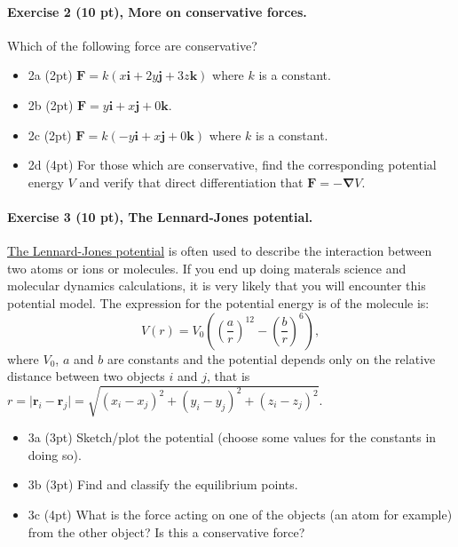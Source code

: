 \documentclass[%
oneside,                 %
final,                   %
10pt]{article}
\begin{document}
\noindent
\paragraph{Exercise 2 (10 pt), More on conservative forces.}
Which of the following force are conservative?
\begin{itemize}
\item 2a (2pt) $\bm{F}=k(x\bm{i}+2y\bm{j}+3z\bm{k})$ where $k$ is a constant.

\item 2b (2pt) $\bm{F}=y\bm{i}+x\bm{j}+0\bm{k}$.

\item 2c (2pt) $\bm{F}=k(-y\bm{i}+x\bm{j}+0\bm{k})$ where $k$ is a constant.

\item 2d (4pt) For those which are conservative, find the corresponding potential energy $V$ and verify that direct differentiation that $\bm{F}=-\bm{\nabla} V$.
\end{itemize}

\noindent
\paragraph{Exercise 3 (10 pt), The Lennard-Jones potential.}
\href{{https://en.wikipedia.org/wiki/Lennard-Jones_potential}}{The Lennard-Jones potential} is often used to describe
the interaction between two atoms or ions or molecules. If you end up doing materals science and molecular dynamics calculations, it is very likely that you will encounter this potential model.
The expression for the potential energy is
of the molecule is:
\[
V(r) = V_0\left((\frac{a}{r})^{12}-(\frac{b}{r})^{6}\right),
\]
where $V_0$, $a$ and $b$ are constants and the potential depends only on the relative distance between two objects
$i$ and $j$, that is $r=\vert\bm{r}_i-\bm{r}_j\vert=\sqrt{(x_i-x_j)^2+(y_i-y_j)^2+(z_i-z_j)^2}$.

\begin{itemize}
\item 3a (3pt) Sketch/plot the potential (choose some values for the constants in doing so).

\item 3b (3pt) Find and classify the equilibrium points.

\item 3c (4pt) What is the force acting on one of the objects (an atom for example) from the other object? Is this a conservative force?
\end{itemize}
\end{document}
